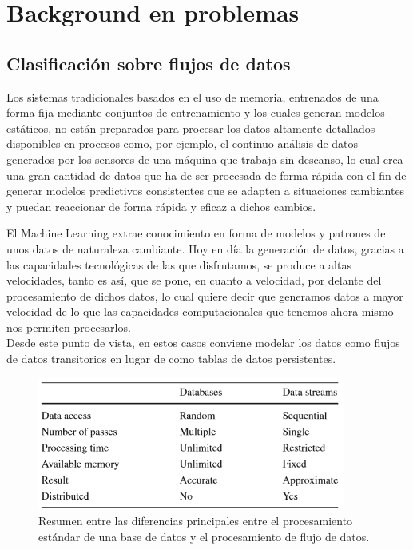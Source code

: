 \chapter[Capítulo 2. Background en problemas]{Background en problemas}

\section{Clasificación sobre flujos de datos}

Los sistemas tradicionales basados en el uso de memoria, entrenados de una forma fija mediante conjuntos de entrenamiento y los cuales generan modelos estáticos, no están
preparados para procesar los datos altamente detallados disponibles en procesos como, por ejemplo, el continuo análisis de datos generados por los sensores de una máquina que trabaja sin descanso, lo cual crea una gran cantidad de datos que ha de ser procesada de forma rápida con el fin de generar modelos predictivos consistentes
que se adapten a situaciones cambiantes y puedan reaccionar de forma rápida y eficaz a dichos cambios.

El Machine Learning extrae conocimiento en forma de modelos y patrones de unos datos de naturaleza cambiante. Hoy en día la generación de datos, gracias a las capacidades
tecnológicas de las que disfrutamos, se produce a altas velocidades, tanto es así, que se pone, en cuanto a velocidad, por delante del procesamiento de dichos datos, lo cual
quiere decir que generamos datos a mayor velocidad de lo que las capacidades computacionales que tenemos ahora mismo nos permiten procesarlos.\\
Desde este punto de vista, en estos casos conviene modelar los datos como flujos de datos transitorios en lugar de como tablas de datos persistentes.

\begin{figure}[H]
	\centering
	\includegraphics[width=0.9\textwidth]{imagenes/tabla1} 
	\caption{Resumen entre las diferencias principales entre el procesamiento estándar de una base de datos y el procesamiento de flujo de datos. \cite{ref1}}
\end{figure}



